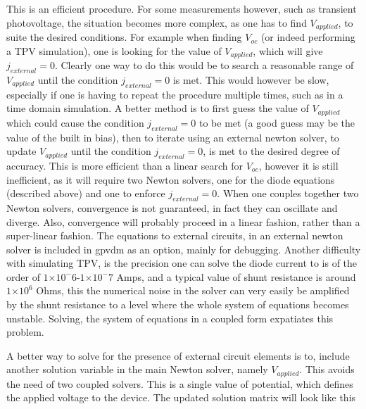 \documentclass[11pt]{article}
\providecommand{\e}[1]{\ensuremath{\times 10^{#1}}}
\begin{document}
This is an efficient procedure.  For some measurements however, such as transient photovoltage, the situation becomes more complex, as one has to find $V_{applied}$, to suite the desired conditions.  For example when finding $V_{oc}$ (or indeed performing a TPV simulation), one is looking for the value of $V_{applied}$, which will give $j_{external}=0$.  Clearly one way to do this would be to search a reasonable range of $V_{applied}$ until the condition $j_{external}=0$ is met.  This would however be slow, especially if one is having to repeat the procedure multiple times, such as in a time domain simulation.  A better method is to first guess the value of $V_{applied}$ which could cause the condition $j_{external}=0$ to be met (a good guess may be the value of the built in bias), then to iterate using an external newton solver, to update $V_{applied}$ until the condition $j_{external}=0$, is met to the desired degree of accuracy.  This is more efficient than a linear search for $V_{oc}$, however it is still inefficient, as it will require two Newton solvers, one for the diode equations (described above) and one to enforce $j_{external}=0$.  When one couples together two Newton solvers, convergence is not guaranteed, in fact they can oscillate and diverge.  Also, convergence will probably proceed in a linear fashion, rather than a super-linear fashion.  The equations to external circuits, in an external newton solver is included in gpvdm as an option, mainly for debugging.  Another difficulty with simulating TPV, is the precision one can solve the diode current to is of the order of $1\e-6$-$1\e-7$ Amps, and a typical value of shunt resistance is around $1\e6$ Ohms, this the numerical noise in the solver can very easily be amplified by the shunt resistance to a level where the whole system of equations becomes unstable.  Solving, the system of equations in a coupled form expatiates this problem.

A better way to solve for the presence of external circuit elements is to, include another solution variable in the main Newton solver, namely $V_{applied}$.  This avoids the need of two coupled solvers.  This is a single value of potential, which defines the applied voltage to the device. The updated solution matrix will look like this
\end{document}
